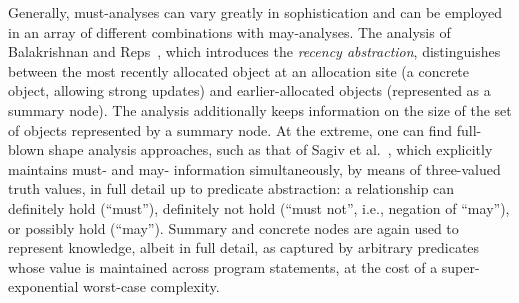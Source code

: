 Generally, must-analyses can vary greatly in sophistication and can be
employed in an array of different combinations with may-analyses.  The
analysis of Balakrishnan and Reps~\cite{sas:2006:Balakrishnan}, which
introduces the \emph{recency abstraction}, distinguishes between the
most recently allocated object at an allocation site (a concrete
object, allowing strong updates) and earlier-allocated objects
(represented as a summary node). The analysis additionally keeps
information on the size of the set of objects represented by a summary
node. At the extreme, one can find full-blown shape analysis
approaches, such as that of Sagiv et
al.~\cite{article:2002:Sagiv}, which explicitly maintains must-
and may- information simultaneously, by means of three-valued truth
values, in full detail up to predicate abstraction: a
relationship can definitely hold (``must''), definitely not hold
(``must not'', i.e., negation of ``may''), or possibly hold
(``may''). Summary and concrete nodes are again used to represent
knowledge, albeit in full detail, as captured by arbitrary predicates
whose value is maintained across program statements, at the cost of a
super-exponential worst-case complexity.




